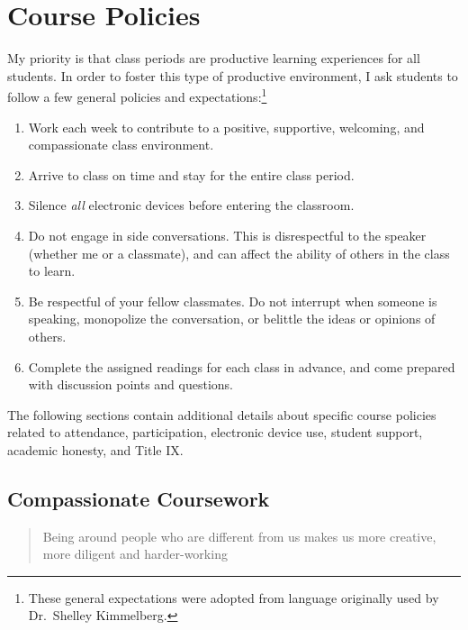 \documentclass[]{book}
\providecommand{\tightlist}{%
  \setlength{\itemsep}{0pt}\setlength{\parskip}{0pt}}
\let\rmarkdownfootnote\footnote%
\def\footnote{\protect\rmarkdownfootnote}
\theoremstyle{definition}
\theoremstyle{definition}
\theoremstyle{definition}
\theoremstyle{remark}
\begin{document}
\hypertarget{course-policies}{%
\chapter{Course Policies}\label{course-policies}}

My priority is that class periods are productive learning experiences
for all students. In order to foster this type of productive
environment, I ask students to follow a few general policies and
expectations:\footnote{These general expectations were adopted from
  language originally used by Dr.~Shelley Kimmelberg.}

\begin{enumerate}
\def\labelenumi{\arabic{enumi}.}
\tightlist
\item
  Work each week to contribute to a positive, supportive, welcoming, and
  compassionate class environment.
\item
  Arrive to class on time and stay for the entire class period.
\item
  Silence \emph{all} electronic devices before entering the classroom.
\item
  Do not engage in side conversations. This is disrespectful to the
  speaker (whether me or a classmate), and can affect the ability of
  others in the class to learn.
\item
  Be respectful of your fellow classmates. Do not interrupt when someone
  is speaking, monopolize the conversation, or belittle the ideas or
  opinions of others.
\item
  Complete the assigned readings for each class in advance, and come
  prepared with discussion points and questions.
\end{enumerate}

The following sections contain additional details about specific course
policies related to attendance, participation, electronic device use,
student support, academic honesty, and Title IX.

\hypertarget{compassionate-coursework}{%
\section{Compassionate Coursework}\label{compassionate-coursework}}

\begin{quote}
Being around people who are different from us makes us more creative,
more diligent and harder-working
\end{quote}
\end{document}
